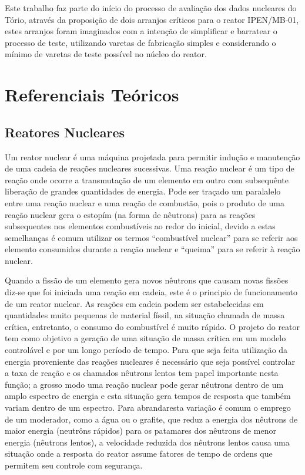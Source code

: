 \documentclass[
	12pt,				%
	openany,			%
	twoside,			%
	a4paper,			%
	english,			%
	french,				%
	spanish,			%
	brazil				%
	]{abntex2}
\begin{document}
Este trabalho faz parte do início do processo de avaliação dos dados nucleares do Tório, através da proposição de dois arranjos críticos para o reator IPEN/MB-01, estes arranjos foram imaginados com a intenção de simplificar e barratear o processo de teste, utilizando varetas de fabricação simples e considerando o mínimo de varetas de teste possível no núcleo do reator.

\chapter{Referenciais Teóricos}

\section{Reatores Nucleares}

Um reator nuclear é uma máquina projetada para permitir indução e manutenção de uma cadeia de reações nucleares sucessivas. Uma reação nuclear é um tipo de reação onde ocorre a transmutação de um elemento em outro com subsequênte liberação de grandes quantidades de energia. Pode ser traçado um paralalelo entre uma reação nuclear e uma reação de combustão, pois o produto de uma reação nuclear gera o estopím (na forma de nêutrons) para as reações subsequentes nos elementos combustíveis ao redor do inicial, devido a estas semelhanças é comum utilizar os termos ``combustível nuclear'' para se referir aos elemento consumidos durante a reação nuclear e ``queima'' para se referir à reação nuclear.

Quando a fissão de um elemento gera novos nêutrons que causam novas fissões diz-se que foi iniciada uma reação em cadeia, este é o principio de funcionamento de um reator nuclear. As reações em cadeia podem ser estabelecidas em quantidades muito pequenas de material físsil, na situação chamada de massa crítica, entretanto, o consumo do combustível é muito rápido. O projeto do reator tem como objetivo a geração de uma situação de massa crítica em um modelo controlável e por um longo período de tempo. Para que seja feita utilização da energia proveniente das reações nucleares é necessário que seja possível controlar a taxa de reação e os chamados nêutrons lentos tem papel importante nesta função; a grosso modo uma reação nuclear pode gerar nêutrons dentro de um amplo espectro de energia e esta situação gera tempos de resposta que também variam dentro de um espectro. Para abrandaresta variação é comum o emprego de um moderador, como a água ou o
grafite, que reduz a energia dos nêutrons de maior energia (neutrôns rápidos) para os patamares dos nêutrons de menor energia (nêutrons lentos), a velocidade reduzida dos nêutrons lentos causa uma situação onde a resposta do reator assume fatores de tempo de ordens que permitem seu controle com segurança\cite{10fundamentos}. 
\end{document}
